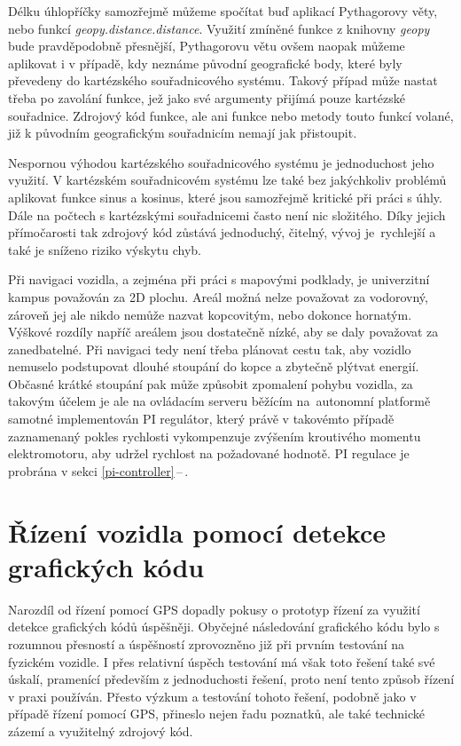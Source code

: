 \documentclass[czech, bachelor]{diploma}
\newcommand{\filipref}[1]{\ref{#1}\,--\,\nameref{#1}}
\begin{document}
Délku úhlopříčky samozřejmě můžeme spočítat buď aplikací Pythagorovy věty, nebo funkcí \emph{geopy.distance.distance}. Využití
zmíněné funkce z knihovny \emph{geopy} bude pravděpodobně přesnější, Pythagorovu větu ovšem naopak můžeme aplikovat i v případě,
kdy neznáme původní geografické body, které byly převedeny do kartézského souřadnicového systému. Takový případ může nastat třeba
po zavolání funkce, jež jako své argumenty přijímá pouze kartézské souřadnice. Zdrojový kód funkce, ale ani funkce nebo metody
touto funkcí volané, již k původním geografickým souřadnicím nemají jak přistoupit.

Nespornou výhodou kartézského souřadnicového systému je jednoduchost jeho využití. V kartézském souřadnicovém systému lze také
bez jakýchkoliv problémů aplikovat funkce sinus a kosinus, které jsou samozřejmě kritické při práci s úhly. Dále na počtech
s kartézskými souřadnicemi často není nic složitého. Díky jejich přímočarosti tak zdrojový kód zůstává jednoduchý, čitelný,
vývoj je~rychlejší a také je sníženo riziko výskytu chyb.

Při navigaci vozidla, a zejména při práci s mapovými podklady, je univerzitní kampus považován za 2D plochu. Areál možná nelze
považovat za vodorovný, zároveň jej ale nikdo nemůže nazvat kopcovitým, nebo dokonce hornatým. Výškové rozdíly napříč areálem jsou
dostatečně nízké, aby se daly považovat za zanedbatelné. Při navigaci tedy není třeba plánovat cestu tak, aby vozidlo nemuselo
podstupovat dlouhé stoupání do kopce a zbytečně plýtvat energií. Občasné krátké stoupání pak může způsobit zpomalení pohybu
vozidla, za takovým účelem je ale na ovládacím serveru běžícím na~autonomní platformě samotné implementován PI regulátor, který
právě v takovémto případě zaznamenaný pokles rychlosti vykompenzuje zvýšením kroutivého momentu elektromotoru, aby udržel rychlost
na požadované hodnotě. PI regulace je probrána v sekci \filipref{pi-controller}.

\section{Řízení vozidla pomocí detekce grafických kódu}

Narozdíl od řízení pomocí GPS dopadly pokusy o prototyp řízení za využití detekce grafických kódů úspěšněji. Obyčejné následování
grafického kódu bylo s rozumnou přesností a úspěšností zprovozněno již při prvním testování na fyzickém vozidle. I přes relativní
úspěch testování má však toto řešení také své úskalí, pramenící především z jednoduchosti řešení, proto není tento způsob řízení
v praxi používán. Přesto výzkum a testování tohoto řešení, podobně jako v případě řízení pomocí GPS, přineslo nejen řadu poznatků,
ale také technické zázemí a využitelný zdrojový kód.
\end{document}
